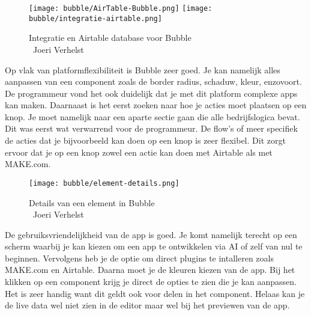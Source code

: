 \begin{figure}[H]
    \texttt{[image: bubble/AirTable-Bubble.png]}
    \texttt{[image: bubble/integratie-airtable.png]}
    \caption[Integratie en Airtable database voor Bubble]{Integratie en Airtable database voor Bubble\\\textcopyright\ Joeri Verhelst}
    \label{fig:airtable-bubble}
\end{figure}
Op vlak van platformflexibiliteit is Bubble zeer goed. Je kan namelijk alles aanpassen van een component zoals de border radius, schaduw, kleur, enzovoort. 
De programmeur vond het ook duidelijk dat je met dit platform complexe apps kan maken. Daarnaast is het eerst zoeken naar hoe je acties moet plaatsen op een knop.
Je moet namelijk naar een aparte sectie gaan die alle bedrijfslogica bevat. Dit was eerst wat verwarrend voor de programmeur. De flow's of meer specifiek de acties dat je bijvoorbeeld kan doen op een 
knop is zeer flexibel. Dit zorgt ervoor dat je op een knop zowel een actie kan doen met Airtable als met MAKE.com.
\\

\begin{figure}[H]
    \texttt{[image: bubble/element-details.png]}
    \caption[Details van een element in Bubble]{Details van een element in Bubble\\\textcopyright\ Joeri Verhelst}
    \label{fig:element-bubble}
\end{figure}
De gebruiksvriendelijkheid van de app is goed. Je komt namelijk terecht
op een scherm waarbij je kan kiezen om een app te ontwikkelen via AI of zelf van nul te beginnen. 
Vervolgens heb je de optie om direct plugins te intalleren zoals MAKE.com en Airtable. Daarna moet je de kleuren kiezen van de app.
Bij het klikken op een component krijg je direct de opties te zien die je kan aanpassen. Het is zeer handig want dit geldt ook voor delen in het component. Helaas 
kan je de live data wel niet zien in de editor maar wel bij het previewen van de app.
\\
\\
